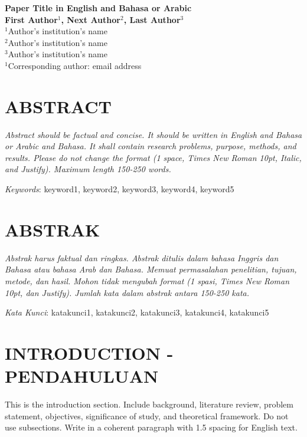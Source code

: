 \documentclass[12pt]{article}
\newcommand{\eng}{\onehalfspacing}
\newcommand{\ind}{\singlespacing}
\begin{document}

\begin{center}
    {\LARGE\bfseries Paper Title in English and Bahasa or Arabic}\\[0.5cm]
    {\bfseries First Author$^1$, Next Author$^2$, Last Author$^3$} \\[0.3cm]
    $^1$Author’s institution’s name\\
    $^2$Author’s institution’s name\\
    $^3$Author’s institution’s name\\[0.2cm]
    $^1$Corresponding author: email address
\end{center}

\section*{ABSTRACT}
\eng
\textit{Abstract should be factual and concise. It should be written in English and Bahasa or Arabic and Bahasa. It shall contain research problems, purpose, methods, and results. Please do not change the format (1 space, Times New Roman 10pt, Italic, and Justify). Maximum length 150-250 words.}

\textit{Keywords}: keyword1, keyword2, keyword3, keyword4, keyword5

\section*{ABSTRAK}
\ind
\textit{Abstrak harus faktual dan ringkas. Abstrak ditulis dalam bahasa Inggris dan Bahasa atau bahasa Arab dan Bahasa. Memuat permasalahan penelitian, tujuan, metode, dan hasil. Mohon tidak mengubah format (1 spasi, Times New Roman 10pt, dan Justify). Jumlah kata dalam abstrak antara 150-250 kata.}

\textit{Kata Kunci}: katakunci1, katakunci2, katakunci3, katakunci4, katakunci5

\section*{INTRODUCTION - PENDAHULUAN}
\setlength{\parindent}{0pt}
\eng
This is the introduction section. Include background, literature review, problem statement, objectives, significance of study, and theoretical framework. Do not use subsections. Write in a coherent paragraph with 1.5 spacing for English text.
\end{document}
